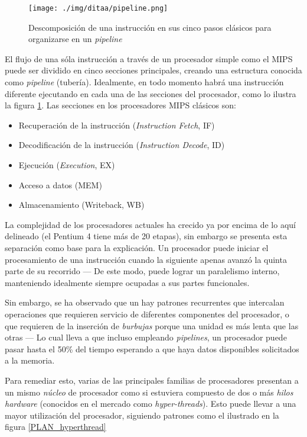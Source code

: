 \documentclass[11pt,fleqn]{book} %
\begin{document}
\begin{figure}[htb]
\centering
\texttt{[image: ./img/ditaa/pipeline.png]}
\caption{\label{PLAN_pipeline}Descomposición de una instrucción en sus cinco pasos clásicos para organizarse en un \emph{pipeline}}
\end{figure}

El flujo de una sóla instrucción a través de un procesador simple como
el MIPS puede ser dividido en cinco secciones principales, creando una
estructura conocida como \emph{pipeline} (tubería). Idealmente, en todo
momento habrá una instrucción diferente ejecutando en cada una de las
secciones del procesador, como lo ilustra la figura
\ref{PLAN_pipeline}. Las secciones en los procesadores MIPS clásicos
son:

\begin{itemize}
\item Recuperación de la instrucción (\emph{Instruction Fetch}, IF)
\item Decodificación de la instrucción (\emph{Instruction Decode}, ID)
\item Ejecución (\emph{Execution}, EX)
\item Acceso a datos (MEM)
\item Almacenamiento (Writeback, WB)
\end{itemize}

La complejidad de los procesadores actuales ha crecido ya por encima
de lo aquí delineado (el Pentium 4 tiene más de 20 etapas), sin
embargo se presenta esta separación como base para la explicación. Un
procesador puede iniciar el procesamiento de una instrucción cuando la
siguiente apenas avanzó la quinta parte de su recorrido — De este
modo, puede lograr un paralelismo interno, manteniendo idealmente
siempre ocupadas a sus partes funcionales.

Sin embargo, se ha observado que un hay patrones recurrentes que
intercalan operaciones que requieren servicio de diferentes
componentes del procesador, o que requieren de la inserción de
\emph{burbujas} porque una unidad es más lenta que las otras — Lo cual
lleva a que incluso empleando \emph{pipelines}, un procesador puede pasar
hasta el 50\% del tiempo esperando a que haya datos disponibles
solicitados a la memoria.

Para remediar esto, varias de las principales familias de
procesadores presentan a un mismo \emph{núcleo} de procesador como si
estuviera compuesto de dos o más \emph{hilos hardware} (conocidos en el
mercado como \emph{hyper-threads}). Esto puede llevar a una mayor
utilización del procesador, siguiendo patrones como el ilustrado en
la figura \ref{PLAN_hyperthread}
\end{document}
